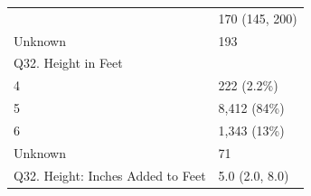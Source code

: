 \documentclass[]{article}
\begin{document}
\begin{longtable}[]{@{}ll@{}}
\begin{minipage}[t]{0.71\columnwidth}
\end{minipage} & \begin{minipage}[t]{0.23\columnwidth}\raggedright
170 (145, 200)\strut
\end{minipage}\tabularnewline
\begin{minipage}[t]{0.71\columnwidth}\raggedright
Unknown\strut
\end{minipage} & \begin{minipage}[t]{0.23\columnwidth}\raggedright
193\strut
\end{minipage}\tabularnewline
\begin{minipage}[t]{0.71\columnwidth}\raggedright
Q32. Height in Feet\strut
\end{minipage} & \begin{minipage}[t]{0.23\columnwidth}\raggedright
\strut
\end{minipage}\tabularnewline
\begin{minipage}[t]{0.71\columnwidth}\raggedright
4\strut
\end{minipage} & \begin{minipage}[t]{0.23\columnwidth}\raggedright
222 (2.2\%)\strut
\end{minipage}\tabularnewline
\begin{minipage}[t]{0.71\columnwidth}\raggedright
5\strut
\end{minipage} & \begin{minipage}[t]{0.23\columnwidth}\raggedright
8,412 (84\%)\strut
\end{minipage}\tabularnewline
\begin{minipage}[t]{0.71\columnwidth}\raggedright
6\strut
\end{minipage} & \begin{minipage}[t]{0.23\columnwidth}\raggedright
1,343 (13\%)\strut
\end{minipage}\tabularnewline
\begin{minipage}[t]{0.71\columnwidth}\raggedright
Unknown\strut
\end{minipage} & \begin{minipage}[t]{0.23\columnwidth}\raggedright
71\strut
\end{minipage}\tabularnewline
\begin{minipage}[t]{0.71\columnwidth}\raggedright
Q32. Height: Inches Added to Feet\strut
\end{minipage} & \begin{minipage}[t]{0.23\columnwidth}\raggedright
5.0 (2.0, 8.0)\strut
\end{minipage}\tabularnewline

\end{longtable}
\end{document}
